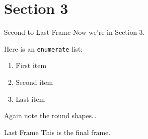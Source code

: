 
\section{Section 3}

\begin{frame}{Second to Last Frame}
    Now we're in Section 3.

    Here is an \texttt{enumerate} list:
    \begin{enumerate}
        \item
        First item

        \item
        Second item

        \item
        Last item
    \end{enumerate}
    Again note the round shapes\dots
\end{frame}

\begin{frame}{Last Frame}
    This is the final frame.
\end{frame}



\thanksframe
